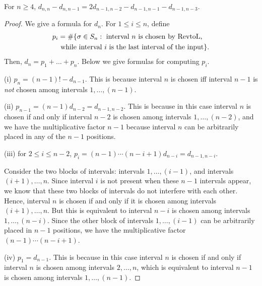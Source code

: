 \documentclass[10pt,a4paper]{amsart}
\newcommand{\RtoL}{\text{RevtoL}\xspace} %
\begin{document}
\begin{proposition}   \label{thm:formula_dn_difference}
    For $n\ge 4$,
        $d_{n,n} - d_{n,n-1} = 2d_{n-1,n-2} - d_{n-1,n-1} - d_{n-1,n-3}$.
\end{proposition}

\begin{proof}
    We give a formula for $d_n$. For 
        $1 \le i \le n$, 
    define
        \begin{equation}    \label{eq:def_pi}
	\begin{split}
            p_i &= \#\{\sigma \in S_n: \text{ interval } n \text{ is  chosen by \RtoL,}  \\
			&\text{ while interval } i \text{ is the last interval of the input} \}.
	\end{split}
        \end{equation}
    Then,
        $d_n = p_1 + \ldots + p_n$.
    Below we give formulas for computing $p_i$.

 	(i) $p_n = (n-1)! - d_{n-1}$.             This is because interval $n$ is chosen iff interval $n-1$ is \emph{not} chosen among intervals
                $1, \ldots, (n-1)$.

       (ii)  $p_{n-1} = (n-1) d_{n-2} = d_{n-1,n-2}$.       This is because in this case interval $n$ is chosen if and only if interval $n-2$ is chosen among intervals 
                $1, \ldots, (n-2)$, 
            and we have the multiplicative factor $n-1$ because interval $n$ can be arbitrarily placed in any of the $n-1$ positions.

        (iii)  for $2 \le i \le n-2$, 
            $p_i = (n-1)\cdots(n-i+1)d_{n-i} = d_{n-1,n-i}$.
            
            Consider the two blocks of intervals: intervals 
                $1, \ldots, (i-1)$, 
            and intervals 
                $(i+1), \ldots, n$. 
            Since interval $i$ is not present when these $n-1$ intervals appear, we know that these two blocks of intervals do not interfere with each other. Hence, interval $n$ is chosen if and only if it is chosen among intervals 
                $(i+1), \ldots, n$. 
            But this is equivalent to interval $n-i$ is chosen among intervals 
                $1, \ldots, (n-i)$. 
            Since the other block of intervals 
                $1, \ldots, (i-1)$ 
            can be arbitrarily placed in $n-1$ positions, we have the multiplicative factor 
                $(n-1)\cdots(n-i+1)$.

        (iv)  $p_1 = d_{n-1}$.      This is because in this case interval $n$ is chosen if and only if interval $n$ is chosen among intervals 
                $2, \ldots, n$, 
            which is equivalent to interval $n-1$ is chosen among intervals 
                $1, \ldots, (n-1)$.


\end{proof}
\end{document}
